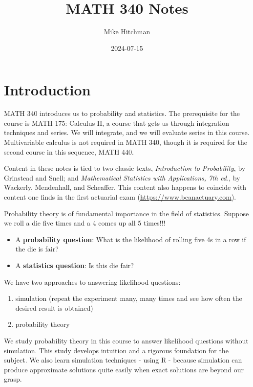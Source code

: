 \documentclass[
]{book}
\title{MATH 340 Notes}
\author{Mike Hitchman}
\date{2024-07-15}
\providecommand{\tightlist}{%
  \setlength{\itemsep}{0pt}\setlength{\parskip}{0pt}}
\theoremstyle{definition}
\theoremstyle{definition}
\theoremstyle{definition}
\theoremstyle{definition}
\theoremstyle{remark}
\begin{document}
\maketitle

{
\setcounter{tocdepth}{1}
\tableofcontents
}
\chapter{Introduction}\label{introduction}

MATH 340 introduces us to probability and statistics. The prerequisite for the course is MATH 175: Calculus II, a course that gets us through integration techniques and series. We will integrate, and we will evaluate series in this course. Multivariable calculus is not required in MATH 340, though it is required for the second course in this sequence, MATH 440.

Content in these notes is tied to two classic texts, \emph{Introduction to Probability}, by Grinstead and Snell; and \emph{Mathematical Statistics with Applications, 7th ed.}, by Wackerly, Mendenhall, and Scheaffer. This content also happens to coincide with content one finds in the first actuarial exam (\url{https://www.beanactuary.com}).

Probability theory is of fundamental importance in the field of statistics. Suppose we roll a die five times and a 4 comes up all 5 times!!!

\begin{itemize}
\tightlist
\item
  A \textbf{probability question}: What is the likelihood of rolling five 4s in a row if the die is fair?
\item
  A \textbf{statistics question}: Is this die fair?
\end{itemize}

We have two approaches to answering likelihood questions:

\begin{enumerate}
\def\labelenumi{\arabic{enumi}.}
\tightlist
\item
  simulation (repeat the experiment many, many times and see how often the desired result is obtained)
\item
  probability theory
\end{enumerate}

We study probability theory in this course to answer likelihood questions without simulation. This study develops intuition and a rigorous foundation for the subject. We also learn simulation techniques - using R - because simulation can produce approximate solutions quite easily when exact solutions are beyond our grasp.
\end{document}
